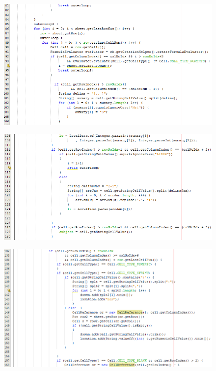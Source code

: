 \begin{enumerate}
\begin{figure}[H]
		\end{figure}
		\begin{figure}[H]
		\includegraphics[scale=0.8]{Gambar/excelConverter2}
		\end{figure}
		\begin{figure}[H]
		\includegraphics[scale=0.8]{Gambar/excelConverter3}
		\end{figure}
		\begin{figure}[H]
		\includegraphics[scale=0.8]{Gambar/excelConverter4}

\end{figure}
\end{enumerate}
